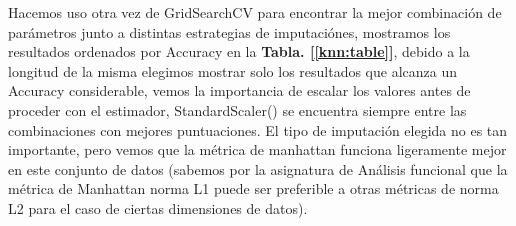 \documentclass[12pt,twoside]{report}
\begin{document}
Hacemos uso otra vez de GridSearchCV para encontrar la mejor combinación de parámetros junto a distintas estrategias de imputaciónes, mostramos los resultados ordenados por Accuracy en la \textbf{Tabla. [\ref{knn:table}]}, debido a la longitud de la misma elegimos mostrar solo los resultados que alcanza un Accuracy considerable, vemos la importancia de escalar los valores antes de proceder con el estimador, StandardScaler() se encuentra siempre entre las combinaciones con mejores puntuaciones. El tipo de imputación elegida no es tan importante, pero vemos que la métrica de manhattan funciona ligeramente mejor en este conjunto de datos (sabemos por la asignatura de Análisis funcional que la métrica de Manhattan norma L1 puede ser preferible a otras métricas de norma L2 para el caso de ciertas dimensiones de datos).
\end{document}
